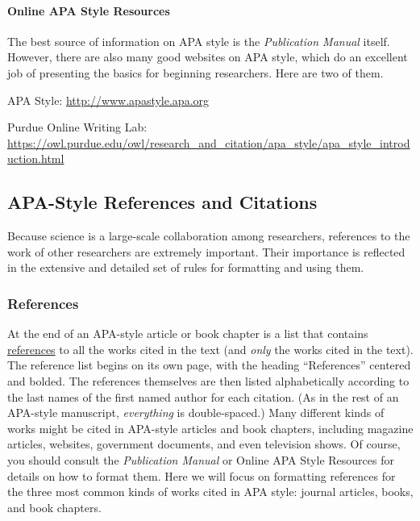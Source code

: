 \documentclass[
]{krantz}
\begin{document}
\paragraph*{Online APA Style Resources}\label{online-apa-style-resources}

The best source of information on APA style is the \emph{Publication Manual} itself. However, there are also many good websites on APA style, which do an excellent job of presenting the basics for beginning researchers. Here are two of them.

APA Style: \url{http://www.apastyle.apa.org}

Purdue Online Writing Lab: \url{https://owl.purdue.edu/owl/research_and_citation/apa_style/apa_style_introduction.html}

\subsection*{APA-Style References and Citations}\label{apa-style-references-and-citations}


Because science is a large-scale collaboration among researchers, references to the work of other researchers are extremely important. Their importance is reflected in the extensive and detailed set of rules for formatting and using them.

\subsubsection*{References}\label{references}


At the end of an APA-style article or book chapter is a list that contains \hyperref[reference]{references} to all the works cited in the text (and \emph{only} the works cited in the text). The reference list begins on its own page, with the heading ``References'' centered and bolded. The references themselves are then listed alphabetically according to the last names of the first named author for each citation. (As in the rest of an APA-style manuscript, \emph{everything} is double-spaced.) Many different kinds of works might be cited in APA-style articles and book chapters, including magazine articles, websites, government documents, and even television shows. Of course, you should consult the \emph{Publication Manual} or Online APA Style Resources for details on how to format them. Here we will focus on formatting references for the three most common kinds of works cited in APA style: journal articles, books, and book chapters.
\end{document}
